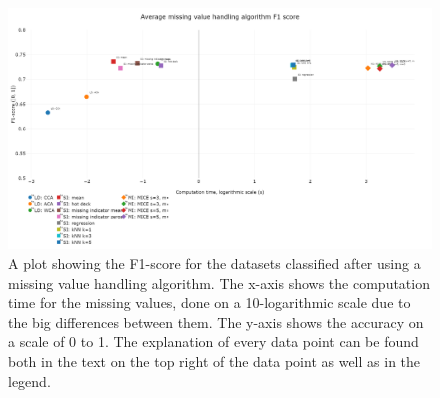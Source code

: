 \documentclass[10pt,a4paper]{report}
\begin{document}
	\begin{figure}[H]
		\centering
		\includegraphics[angle=90,height=0.9\textheight]{avg_F1.PNG}
		\caption{A plot showing the F1-score for the datasets classified after using a missing value handling algorithm. The x-axis shows the computation time for the missing values, done on a 10-logarithmic scale due to the big differences between them. The y-axis shows the accuracy on a scale of 0 to 1. The explanation of every data point can be found both in the text on the top right of the data point as well as in the legend.}
		\label{fig:EvalAvgF1}
	\end{figure}
	
\end{document}
